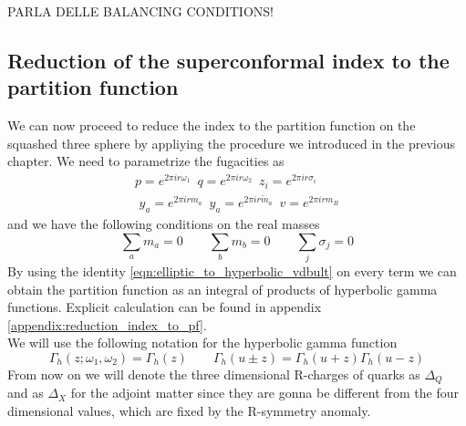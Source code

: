 {\Huge PARLA DELLE BALANCING CONDITIONS!}
\subsection{Reduction of the superconformal index to the partition function}
We can now proceed to reduce the index to the partition function on the squashed three sphere by appliying the procedure we introduced in the previous chapter. 
We need to parametrize the fugacities as
\begin{gather}
p = e^{ 2 \pi i r  \omega_1 } \, \, \,  q = e^{ 2 \pi i r \omega_2 } \,  \, \, z_i = e^{ 2 \pi i r \sigma_i } \\
\, \, y_a = e^{ 2 \pi i r m_a } \, \,  \,
y_a = e^{ 2 \pi i r  {\tilde m_a} } \, \, \,  v = e^{ 2 \pi i r m_B}
\label{eqn:fugacities_redefined_el}
\end{gather}
and we have the following conditions on the real masses
\begin{equation}
\sum_a m_a =0 \qquad \sum_b m_b = 0 \qquad \sum_j \sigma_j = 0
\end{equation}
By using the identity \eqref{eqn:elliptic_to_hyperbolic_vdbult} on every term we can obtain the partition function as an integral of products of hyperbolic gamma functions.
Explicit calculation can be found in appendix \ref{appendix:reduction_index_to_pf}.\\
We will use the following notation for the hyperbolic gamma function
\begin{equation}
\Gamma_h (z ; \omega_1 , \omega_2) = \Gamma_h(z) \qquad \Gamma_h ( u \pm z) = \Gamma_h( u + z) \Gamma_h( u - z)
\end{equation}
From now on we will denote the three dimensional R-charges of quarks as $\Delta_Q$ and as $\Delta_X$ for the adjoint matter since they are gonna be different from the four dimensional values, which are fixed by the R-symmetry anomaly.

